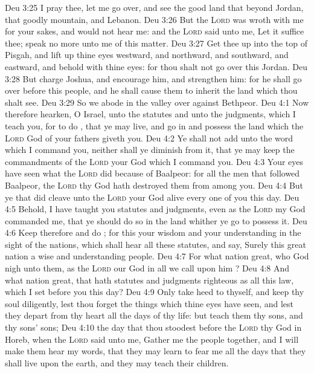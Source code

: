 \vs Deu 3:25 I pray thee, let me go over, and see the good land that  beyond Jordan, that goodly mountain, and Lebanon.
\vs Deu 3:26 But the \textsc{Lord} was wroth with me for your sakes, and would not hear me: and the \textsc{Lord} said unto me, Let it suffice thee; speak no more unto me of this matter.
\vs Deu 3:27 Get thee up into the top of Pisgah, and lift up thine eyes westward, and northward, and southward, and eastward, and behold  with thine eyes: for thou shalt not go over this Jordan.
\vs Deu 3:28 But charge Joshua, and encourage him, and strengthen him: for he shall go over before this people, and he shall cause them to inherit the land which thou shalt see.
\vs Deu 3:29 So we abode in the valley over against Bethpeor.
\vs Deu 4:1 Now therefore hearken, O Israel, unto the statutes and unto the judgments, which I teach you, for to do , that ye may live, and go in and possess the land which the \textsc{Lord} God of your fathers giveth you.
\vs Deu 4:2 Ye shall not add unto the word which I command you, neither shall ye diminish  from it, that ye may keep the commandments of the \textsc{Lord} your God which I command you.
\vs Deu 4:3 Your eyes have seen what the \textsc{Lord} did because of Baalpeor: for all the men that followed Baalpeor, the \textsc{Lord} thy God hath destroyed them from among you.
\vs Deu 4:4 But ye that did cleave unto the \textsc{Lord} your God  alive every one of you this day.
\vs Deu 4:5 Behold, I have taught you statutes and judgments, even as the \textsc{Lord} my God commanded me, that ye should do so in the land whither ye go to possess it.
\vs Deu 4:6 Keep therefore and do ; for this  your wisdom and your understanding in the sight of the nations, which shall hear all these statutes, and say, Surely this great nation  a wise and understanding people.
\vs Deu 4:7 For what nation  great, who  God  nigh unto them, as the \textsc{Lord} our God  in all  we call upon him ?
\vs Deu 4:8 And what nation  great, that hath statutes and judgments  righteous as all this law, which I set before you this day?
\vs Deu 4:9 Only take heed to thyself, and keep thy soul diligently, lest thou forget the things which thine eyes have seen, and lest they depart from thy heart all the days of thy life: but teach them thy sons, and thy sons' sons;
\vs Deu 4:10  the day that thou stoodest before the \textsc{Lord} thy God in Horeb, when the \textsc{Lord} said unto me, Gather me the people together, and I will make them hear my words, that they may learn to fear me all the days that they shall live upon the earth, and  they may teach their children.
